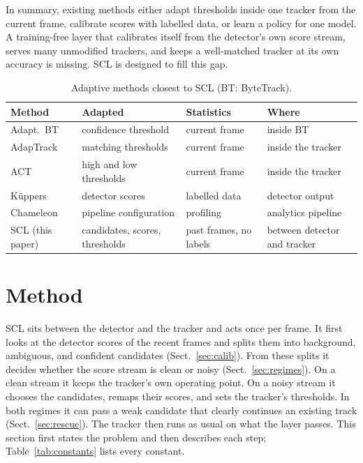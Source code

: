 \documentclass[pdflatex,sn-mathphys-num,iicol]{sn-jnl}
\newcommand{\scl}{SCL}
\begin{document}
In summary, existing methods either adapt thresholds inside one tracker from
the current frame, calibrate scores with labelled data, or learn a policy for
one model. A training-free layer that calibrates itself from the detector's
own score stream, serves many unmodified trackers, and keeps a well-matched
tracker at its own accuracy is missing. \scl{} is designed to fill this gap.

\begin{table}[t]
\caption{Adaptive methods closest to \scl{} (BT: ByteTrack).}
\label{tab:related}
\centering\footnotesize
\setlength{\tabcolsep}{3pt}
\begin{tabular}{@{}>{\raggedright\arraybackslash}p{17mm}>{\raggedright\arraybackslash}p{18mm}>{\raggedright\arraybackslash}p{15mm}>{\raggedright\arraybackslash}p{18mm}@{}}
\toprule
Method & Adapted & Statistics & Where\\
\midrule
Adapt.\ BT \cite{ma2023adaptivebytetrack} & confidence threshold & current frame & inside BT\\
AdapTrack \cite{shim2024adaptrack} & matching thresholds & current frame & inside the tracker\\
ACT \cite{act2026adaptive} & high and low thresholds & current frame & inside the tracker\\
K{\"u}ppers \cite{kuppers2020detcalib} & detector scores & labelled data & detector output\\
Chameleon \cite{jiang2018chameleon} & pipeline configuration & profiling & analytics pipeline\\
\scl{} (this paper) & candidates, scores, thresholds & past frames, no labels & between detector and tracker\\
\bottomrule
\end{tabular}
\end{table}
\section{Method}\label{sec:method}

\scl{} sits between the detector and the tracker and acts once per frame. It
first looks at the detector scores of the recent frames and splits them into
background, ambiguous, and confident candidates (Sect.~\ref{sec:calib}). From
these splits it decides whether the score stream is clean or noisy
(Sect.~\ref{sec:regimes}). On a clean stream it keeps the tracker's own
operating point. On a noisy stream it chooses the candidates, remaps their
scores, and sets the tracker's thresholds. In both regimes it can pass a weak
candidate that clearly continues an existing track (Sect.~\ref{sec:rescue}).
The tracker then runs as usual on what the layer passes. This section first
states the problem and then describes each step; Table~\ref{tab:constants}
lists every constant.
\end{document}
